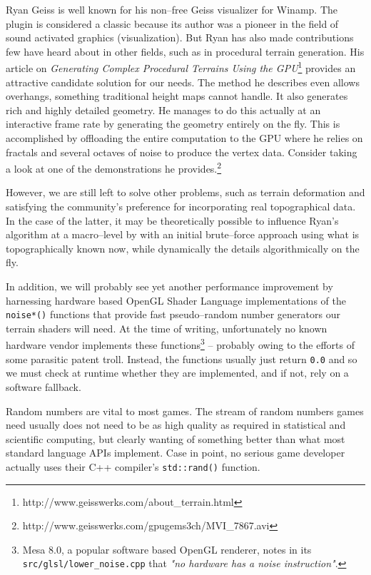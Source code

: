 Ryan Geiss is well known for his non--free Geiss visualizer for Winamp. The plugin is considered a classic because its author was a pioneer in the field of sound activated graphics (visualization). But Ryan has also made contributions few have heard about in other fields, such as in procedural terrain generation. His article on {\it Generating Complex Procedural Terrains Using the GPU}\footnote{http://www.geisswerks.com/about_terrain.html} provides an attractive candidate solution for our needs. The method he describes even allows overhangs, something traditional height maps cannot handle. It also generates rich and highly detailed geometry. He manages to do this actually at an interactive frame rate by generating the geometry entirely on the fly. This is accomplished by offloading the entire computation to the GPU where he relies on fractals and several octaves of noise to produce the vertex data. Consider taking a look at one of the demonstrations he provides.\footnote{http://www.geisswerks.com/gpugems3ch/MVI_7867.avi}

However, we are still left to solve other problems, such as terrain deformation and satisfying the community's preference for incorporating real topographical data. In the case of the latter, it may be theoretically possible to influence Ryan's algorithm at a macro--level by  with an initial brute--force approach using what is topographically known now, while dynamically  the details algorithmically on the fly.

In addition, we will probably see yet another performance improvement by harnessing hardware based OpenGL Shader Language implementations of the {\tt noise*()} functions that provide fast pseudo--random number generators our terrain shaders will need. At the time of writing, unfortunately no known hardware vendor implements these functions\footnote{Mesa 8.0, a popular software based OpenGL renderer, notes in its {\tt src/glsl/lower_noise.cpp} that {\it "no hardware has a noise instruction"}.} -- probably owing to the efforts of some parasitic patent troll. Instead, the functions usually just return {\tt 0.0} and so we must check at runtime whether they are implemented, and if not, rely on a software fallback.

Random numbers are vital to most games. The stream of random numbers games need usually does not need to be as high quality as required in statistical and scientific computing, but clearly wanting of something better than what most standard language APIs implement. Case in point, no serious game developer actually uses their C++ compiler's {\tt std::rand()} function.

